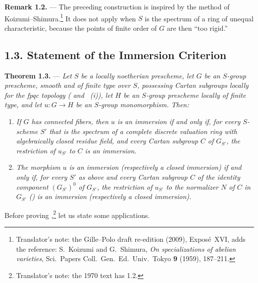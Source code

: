 \medskip
\noindent{}%
\textbf{Remark 1.2.} --- The preceding construction is inspired by
the method of Koizumi--Shimura.\footnote{Translator's note: the Gille--Polo draft re-edition (2009),
Exposé~XVI, adds the reference: S.~Koizumi and G.~Shimura, \emph{On specializations of abelian
varieties}, Sci.\ Papers Coll.\ Gen.\ Ed.\ Univ.\ Tokyo \textbf{9} (1959), 187--211.} It does not apply when \(S\) is the spectrum of a ring of
unequal characteristic, because the points of finite order of \(G\)
are then ``too rigid.''

%
\subsection*{1.3. Statement of the Immersion Criterion}

\medskip
\noindent{}%
\textbf{Theorem 1.3.} --- \textit{Let \(S\) be a locally noetherian
prescheme, let \(G\) be an \(S\)-group prescheme, smooth and of finite
type over \(S\), possessing Cartan subgroups locally for the fpqc
topology ( and ~(i)), let \(H\) be an \(S\)-group
prescheme locally of finite type, and let \(u:G\to H\) be an
\(S\)-group monomorphism. Then:}

\begin{enumerate}
\item[\textit{a)}] \textit{If \(G\) has connected fibers, then \(u\)
is an immersion if and only if, for every \(S\)-scheme \(S'\) that is
the spectrum of a complete discrete valuation ring with algebraically
closed residue field, and every Cartan subgroup \(C\) of \(G_{S'}\),
the restriction of \(u_{S'}\) to \(C\) is an immersion.}

\item[\textit{b)}] \textit{The morphism \(u\) is an immersion
(respectively a closed immersion) if and only if, for every \(S'\) as
above and every Cartan subgroup \(C\) of the identity component
\((G_{S'})^0\) of \(G_{S'}\), the restriction of \(u_{S'}\) to the
normalizer \(N\) of \(C\) in \(G_{S'}\) () is an
immersion (respectively a closed immersion).}
\end{enumerate}

Before proving ,\footnote{Translator's note: the 1970 text has
1.2.} let us state some applications.

